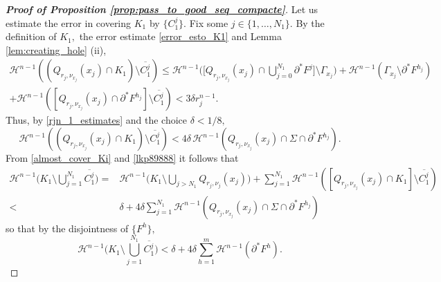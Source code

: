 \documentclass[reqno]{amsart}
\numberwithin{equation}{section}
\theoremstyle{plain}
\theoremstyle{definition}
\newcommand{\cH}{\mathcal{H}}
\newcommand{\p}{\partial}
\newcommand{\cl}[1]{\overline{#1}}
\begin{document}
\begin{proof}[\textbf{Proof of Proposition \ref{prop:pass_to_good_seq_compacte}}]
Let us estimate the error in covering $K_1$ by $\{C_1^j\}.$ Fix some $j\in\{1,\ldots,N_1\}.$ By the definition of $K_1,$ the error estimate \eqref{error_esto_K1} and Lemma \ref{lem:creating_hole} (ii),
\begin{multline*}
\cH^{n-1}((Q_{r_j,\nu_{x_j}}(x_j)\cap K_1)\setminus \cl{C_1^j}) \le \cH^{n-1}\Big(\Big[Q_{r_j,\nu_{x_j}}(x_j)\cap \bigcup_{j=0}^{N_1}\p^*F^j\Big]\setminus \Gamma_{x_j}\Big) + 
\cH^{n-1}(\Gamma_{x_j}\setminus \p^*F^{h_j})\\
+ \cH^{n-1}([Q_{r_j,\nu_{x_j}}(x_j)\cap\p^*F^{h_j}] \setminus \cl{C_1^j}) < 3\delta r_j^{n-1}.
\end{multline*}
Thus, by \eqref{rjn_1_estimates}  and the choice $\delta<1/8,$
\begin{equation}\label{lkp89888}
\cH^{n-1}((Q_{r_j,\nu_{x_j}}(x_j)\cap K_1)\setminus \cl{C_1^j}) < 4\delta\,\cH^{n-1}(Q_{r_j,\nu_{x_j}}(x_j)\cap \Sigma\cap \p^*F^{h_j}). 
\end{equation}
%
From \eqref{almost_cover_Ki} and \eqref{lkp89888} it follows that
\begin{align*}
\cH^{n-1}\Big(K_1\setminus \bigcup_{j=1}^{N_1}\cl{C_1^j}\Big) = & \cH^{n-1}\Big(K_1\setminus \bigcup_{j>N_1}Q_{r_j,\nu_j}(x_j)\Big) + \sum\limits_{j=1}^{N_1} \cH^{n-1}([Q_{r_j,\nu_{x_j}}(x_j) \cap K_1]\setminus \cl{C_1^j})\\
< & \delta + 
4\delta\sum_{j=1}^{N_1}\cH^{n-1}(Q_{r_j,\nu_{x_j}}(x_j)\cap \Sigma\cap \p^*F^{h_j})
\end{align*}
so that  by the disjointness of $\{F^h\},$
\begin{equation}\label{outside_Cj1}
\cH^{n-1}\Big(K_1\setminus \bigcup_{j=1}^{N_1}\cl{C_1^j}\Big) < \delta + 4\delta\sum\limits_{h=1}^{m}\cH^{n-1}(\p^*F^h).
\end{equation}



\end{proof}
\end{document}
